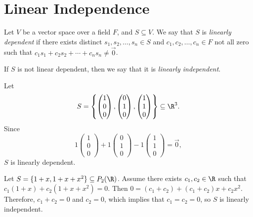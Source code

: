 \documentclass[12pt]{article}
\begin{document}
\section{Linear Independence}

\begin{defn}
    Let $V$ be a vector space over a field $F$, and $S \subseteq V$. We say that $S$ is \emph{linearly dependent} if there exists distinct $s_1, s_2, \ldots, s_n \in S$ and $c_1, c_2, \ldots, c_n \in F$ not all zero such that $c_1s_1 + c_2s_2 + \cdots + c_ns_n \neq \vec{0}$.
\end{defn}

\begin{rmk}
    If $S$ is not linear dependent, then we say that it is \emph{linearly independent}.
\end{rmk}

\begin{exmp}
    Let \[S = \left\{\begin{pmatrix}1 \\ 0 \\ 0\end{pmatrix}, \begin{pmatrix}0 \\ 1 \\ 0\end{pmatrix}, \begin{pmatrix}1 \\ 1 \\ 0\end{pmatrix} \right\} \subseteq \R^3.\] Since \[1\begin{pmatrix}1 \\ 0 \\ 0\end{pmatrix} + 1\begin{pmatrix}0 \\ 1 \\ 0\end{pmatrix} - 1\begin{pmatrix}1 \\ 1 \\ 0\end{pmatrix} = \vec{0},\] $S$ is linearly dependent.
\end{exmp}

\begin{exmp}
    Let $S = \{1 + x, 1 + x + x^2\} \subseteq P_2(\R)$. Assume there exists $c_1, c_2 \in \R$ such that $c_1(1 + x) + c_2(1 + x + x^2) = 0$. Then $0 = (c_1 + c_2) + (c_1 + c_2)x + c_2x^2$. Therefore, $c_1 + c_2 = 0$ and $c_2 = 0$, which implies that $c_1 = c_2 = 0$, so $S$ is linearly independent.
\end{exmp}
\end{document}

